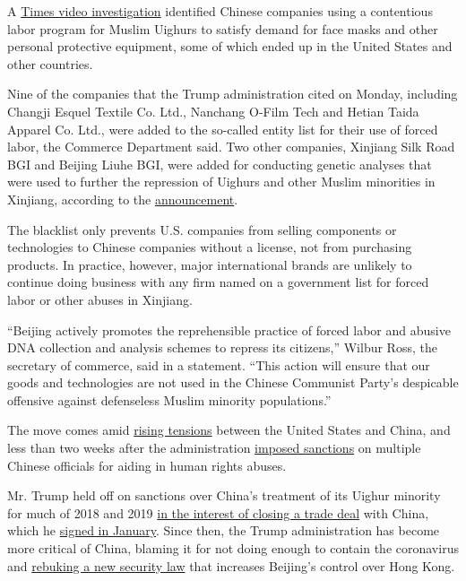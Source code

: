 A
\href{https://www.nytimes.com/2020/07/19/world/asia/china-mask-forced-labor.html}{Times
video investigation} identified Chinese companies using a contentious
labor program for Muslim Uighurs to satisfy demand for face masks and
other personal protective equipment, some of which ended up in the
United States and other countries.

Nine of the companies that the Trump administration cited on Monday,
including Changji Esquel Textile Co. Ltd., Nanchang O-Film Tech and
Hetian Taida Apparel Co. Ltd., were added to the so-called entity list
for their use of forced labor, the Commerce Department said. Two other
companies, Xinjiang Silk Road BGI and Beijing Liuhe BGI, were added for
conducting genetic analyses that were used to further the repression of
Uighurs and other Muslim minorities in Xinjiang, according to the
\href{https://www.commerce.gov/news/press-releases/2020/07/commerce-department-adds-eleven-chinese-entities-implicated-human}{announcement}.

The blacklist only prevents U.S. companies from selling components or
technologies to Chinese companies without a license, not from purchasing
products. In practice, however, major international brands are unlikely
to continue doing business with any firm named on a government list for
forced labor or other abuses in Xinjiang.

``Beijing actively promotes the reprehensible practice of forced labor
and abusive DNA collection and analysis schemes to repress its
citizens,'' Wilbur Ross, the secretary of commerce, said in a statement.
``This action will ensure that our goods and technologies are not used
in the Chinese Communist Party's despicable offensive against
defenseless Muslim minority populations.''

The move comes amid
\href{https://www.nytimes.com/2020/07/14/world/asia/cold-war-china-us.html}{rising
tensions} between the United States and China, and less than two weeks
after the administration
\href{https://www.nytimes.com/2020/07/09/world/asia/trump-china-sanctions-uighurs.html}{imposed
sanctions} on multiple Chinese officials for aiding in human rights
abuses.

Mr. Trump held off on sanctions over China's treatment of its Uighur
minority for much of 2018 and 2019
\href{https://www.nytimes.com/2019/05/04/world/asia/trump-china-uighurs-trade-deal.html}{in
the interest of closing a trade deal} with China, which he
\href{https://www.nytimes.com/2020/01/15/business/economy/china-trade-deal.html}{signed
in January}. Since then, the Trump administration has become more
critical of China, blaming it for not doing enough to contain the
coronavirus and
\href{https://www.nytimes.com/2020/05/29/us/politics/trump-hong-kong-china-WHO.html}{rebuking
a new security law} that increases Beijing's control over Hong Kong.

